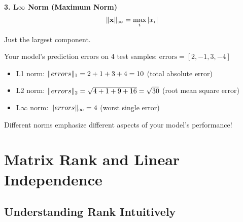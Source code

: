\documentclass{article}
\newcounter{example}
\begin{document}
\textbf{3. L$\infty$ Norm (Maximum Norm)}
$$\|\mathbf{x}\|_\infty = \max_i |x_i|$$

Just the largest component.

\begin{center}
\end{center}

\begin{tcolorbox}[colback=cyan!5!white,colframe=cyan!75!black,title=Example \stepcounter{example}\#\theexample: Error Vector Norms]
Your model's prediction errors on 4 test samples: $\text{errors} = [2, -1, 3, -4]$

\begin{itemize}
    \item L1 norm: $\|errors\|_1 = 2 + 1 + 3 + 4 = 10$ (total absolute error)
    \item L2 norm: $\|errors\|_2 = \sqrt{4 + 1 + 9 + 16} = \sqrt{30}$ (root mean square error)
    \item L$\infty$ norm: $\|errors\|_\infty = 4$ (worst single error)
\end{itemize}

Different norms emphasize different aspects of your model's performance!
\end{tcolorbox}

\section{Matrix Rank and Linear Independence}

\subsection{Understanding Rank Intuitively}
\end{document}
